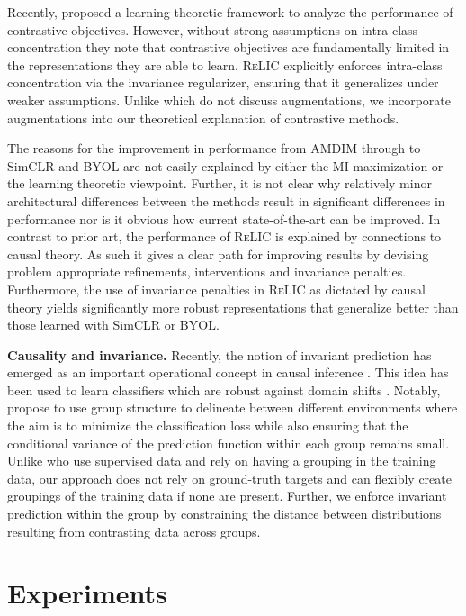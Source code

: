 \documentclass{article}
\newcommand{\relic}{\textsc{ReLIC}}
\begin{document}
Recently, \citep{saunshi2019theoretical} proposed a learning theoretic framework to analyze the performance of contrastive objectives. 
However, without strong assumptions on intra-class concentration they note that contrastive objectives are fundamentally limited in the representations they are able to learn. 
\relic{} explicitly enforces intra-class concentration via the invariance regularizer, ensuring that it generalizes under weaker assumptions. 
Unlike \citep{saunshi2019theoretical} which do not discuss augmentations, we incorporate augmentations into our theoretical explanation of contrastive methods. 

The reasons for the improvement in performance from AMDIM through to SimCLR and BYOL are not easily explained by either the MI maximization or the learning theoretic viewpoint. 
Further, it is not clear why relatively minor architectural differences between the methods result in significant differences in performance nor is it obvious how current state-of-the-art can be improved. 
In contrast to prior art, the performance of \relic{} is explained by connections to causal theory. 
As such it gives a clear path for improving results by devising problem appropriate refinements, interventions and invariance penalties.
Furthermore, the use of invariance penalties in \relic{} as dictated by causal theory yields significantly more robust representations that generalize better than those learned with SimCLR or BYOL.

{\bf Causality and invariance.}
Recently, the notion of invariant prediction has emerged as an important operational concept in causal inference \citep{peters2016causal}. 
This idea has been used to learn classifiers which are robust against domain shifts \citep{gong2016domain}. 
Notably, \citep{heinze2017conditional} 
propose to use group structure to delineate between different environments 
where the aim is to minimize the classification loss while also ensuring that the conditional variance of the prediction function within each group remains small.
Unlike \citep{heinze2017conditional} who use supervised data and rely on having a grouping in the training data, our approach does not rely on ground-truth targets and can flexibly create groupings of the training data if none are present. 
Further, we enforce invariant prediction within the group by constraining the distance between distributions resulting from contrasting data across groups. 
 \section{Experiments}
\label{sec:experiments}
\end{document}

